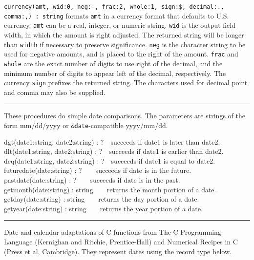 \texttt{currency(amt, wid:0, neg:{\textquotedbl}-{\textquotedbl},
frac:2, whole:1, sign:{\textquotedbl}\${\textquotedbl},
decimal:{\textquotedbl}.{\textquotedbl},
comma:{\textquotedbl},{\textquotedbl}) : string} formats \texttt{amt}
in a currency format that defaults to U.S. currency. \texttt{amt} can
be a real, integer, or numeric string. \texttt{wid} is the output field
width, in which the amount is right adjusted. The returned string will
be longer than \texttt{width} if necessary to preserve significance.
\texttt{neg} is the character string to be used for negative amounts,
and is placed to the right of the amount. \texttt{frac} and
\texttt{whole} are the exact number of digits to use right of the
decimal, and the minimum number of digits to appear left of the
decimal, respectively. The currency \texttt{sign} prefixes the returned
string. The characters used for decimal point and comma may also be
supplied.

\vspace{0.25cm}\hrule{}

These procedures do simple date comparisons. The
parameters are strings of the form mm/dd/yyyy or
\texttt{\&date}{}-compatible yyyy/mm/dd.

dgt(date1:string, date2:string) : ?\ \ succeeds if date1 is later than
date2.\\
dlt(date1:string, date2:string) : ?\ \ succeeds if date1 is earlier than
date2.\\
deq(date1:string, date2:string) : ?\ \ succeeds if date1 is equal to
date2.\\
futuredate(date:string) : ?\ \ \ \ succeeds if date is in the
future.\\
pastdate(date:string) : ?\ \ \ \ succeeds if date is in the
past.\\
getmonth(date:string) : string\ \ \ \ returns the month portion of a
date.\\
getday(date:string) : string\ \ \ \ returns the day portion of a
date.\\
getyear(date:string) : string\ \ \ \ returns the year portion of a date.

\vspace{0.25cm}\hrule{}

Date and calendar adaptations of C functions from
{\textquotedbl}The C Programming Language{\textquotedbl} (Kernighan and
Ritchie, Prentice-Hall) and {\textquotedbl}Numerical Recipes in
C{\textquotedbl} (Press et al, Cambridge). They represent dates using
the record type below.

